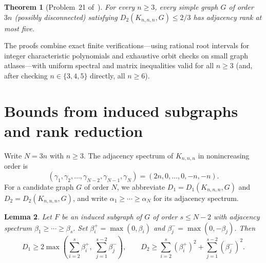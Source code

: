 \documentclass[10pt]{article}
\newtheorem{theorem}{Theorem}
\newtheorem{lemma}[theorem]{Lemma}
\begin{document}
\begin{theorem}[Problem~21 of~\cite{JSS2026}]\label{thm:prob21}
For every $n \geq 3$, every simple graph $G$ of order $3n$ (possibly disconnected) satisfying $D_2(K_{n,n,n}, G) \leq 2/3$ has adjacency rank at most five.
\end{theorem}

The proofs combine exact finite verifications---using rational root intervals for integer characteristic polynomials and exhaustive orbit checks on small graph atlases---with uniform spectral and matrix inequalities valid for all $n \geq 3$ (and, after checking $n \in \{3,4,5\}$ directly, all $n \geq 6$).

\section{Bounds from induced subgraphs and rank reduction}

Write $N = 3n$ with $n \geq 3$. The adjacency spectrum of $K_{n,n,n}$ in nonincreasing order is
\[
(\gamma_1, \gamma_2, \dots, \gamma_{N-2}, \gamma_{N-1}, \gamma_N) = (2n, 0, \dots, 0, -n, -n).
\]
For a candidate graph $G$ of order $N$, we abbreviate $D_1 = D_1(K_{n,n,n}, G)$ and $D_2 = D_2(K_{n,n,n}, G)$, and write $\alpha_1 \geq \cdots \geq \alpha_N$ for its adjacency spectrum.

\begin{lemma}\label{lem:interlacing}
Let $F$ be an induced subgraph of $G$ of order $s \leq N - 2$ with adjacency spectrum $\beta_1 \geq \cdots \geq \beta_s$. Set $\beta_i^+ = \max(0, \beta_i)$ and $\beta_j^- = \max(0, -\beta_j)$. Then
\begin{equation}\label{eq:interlacing}
D_1 \geq 2\max\left(\sum_{i=2}^s \beta_i^+,\; \sum_{j=1}^{s-2} \beta_j^-\right), \qquad
D_2 \geq \sum_{i=2}^s (\beta_i^+)^2 + \sum_{j=1}^{s-2} (\beta_j^-)^2.
\end{equation}
\end{lemma}
\end{document}
